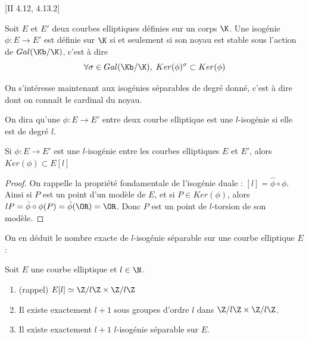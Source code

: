 \begin{Prop}\cite{Sil09}[II 4.12, 4.13.2]
	
	Soit $E$ et $E'$ deux courbes elliptiques définies sur un corps $\K$. Une isogénie $\phi : E\rightarrow E'$ est définie sur $\K$ si et seulement si son noyau est stable sous l'action de $Gal(\Kb/\K)$, c'est à dire
	\begin{equation*}
		\forall\sigma\in Gal(\Kb/\K),\; Ker(\phi)^{\sigma} \subset Ker(\phi)
	\end{equation*}
\end{Prop}

On s'intéresse maintenant aux isogénies séparables de degré donné, c'est à dire dont on connaît le cardinal du noyau.

\begin{Def}
	On dira qu'une $\phi : E\rightarrow E'$ entre deux courbe elliptique est une $l$-isogénie si elle est de degré $l$. 
\end{Def}

\begin{Prop}
	Si $\phi : E\rightarrow E'$ est une $l$-isogénie entre les courbes elliptiques $E$ et $E'$, alors $Ker(\phi)\subset E\left[ l\right] $
\end{Prop}

\begin{proof}
	On rappelle la propriété fondamentale de l'isogénie duale : $\left[ l\right] = \hat{\phi}\circ\phi$. Ainsi si $P$ est un point d'un modèle de $E$, et si $P\in Ker(\phi)$, alors $lP = \hat{\phi}\circ\phi(P) = \hat{\phi}(\OR) = \OR $. Donc $P$ est un point de $l$-torsion de son modèle.
\end{proof}

On en déduit le nombre exacte de $l$-isogénie séparable sur une courbe elliptique $E$ :

\begin{Prop}
	Soit $E$ une courbe elliptique et $l\in\N$.
	\begin{enumerate}
		\item(rappel) $E[l] \simeq \Z/l\Z\times\Z/l\Z$
		\item Il existe exactement $l+1$ sous groupes d'ordre $l$ dans $\Z/l\Z\times\Z/l\Z$.
		\item Il existe exactement $l+1$ $l$-isogénie séparable sur $E$.
	\end{enumerate}
\end{Prop}


